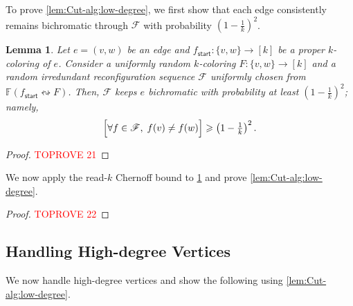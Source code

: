 \documentclass[11pt,fleqn]{article}
\renewcommand{\geq}{\geqslant}
\newcommand{\reco}{\leftrightsquigarrow}
\newcommand{\sss}{\mathsf{start}}
\newcommand{\f}{f}
\newcommand{\frnd}{F}
\newcommand{\sqcol}{\scrF}
\newcommand{\stsqcol}{\bbF}
\newcommand{\bbF}{\mathbb{F}}
\newcommand{\scrF}{\mathscr{F}}
\let\Pr\relax\DeclareMathOperator*{\Pr}{\mathbb{P}}
\newtheorem{lemma}[theorem]{Lemma}
\theoremstyle{definition}
\numberwithin{equation}{section}
\begin{document}
To prove \cref{lem:Cut-alg:low-degree},
we first show that 
each edge consistently remains bichromatic through $\sqcol$
with probability $\left(1-\frac{1}{k}\right)^2$.


\begin{lemma}
\label{lem:Cut-alg:outward}
Let $e = (v,w)$ be an edge and
$\f_\sss \colon \{v,w\} \to [k]$ be a proper $k$-coloring of $e$.
Consider a uniformly random $k$-coloring $\frnd \colon \{v,w\} \to [k]$ and
a random irredundant reconfiguration sequence $\sqcol$
uniformly chosen from $\stsqcol(\f_\sss \reco \frnd)$.
Then, $\sqcol$ keeps $e$ bichromatic with probability at least
$\left(1-\frac{1}{k}\right)^2$\textup{;}
namely,
\begin{align}
    \Pr\Bigl[
        \forall \f \in \sqcol, \;
        \f(v) \neq \f(w)
    \Bigr]
    \geq \left(1-\tfrac{1}{k}\right)^2.
\end{align}
\end{lemma}
\begin{proof}\textcolor{red}{TOPROVE 21}\end{proof}


We now apply the read-$k$ Chernoff bound to \cref{lem:Cut-alg:outward}
and prove \cref{lem:Cut-alg:low-degree}.


\begin{proof}\textcolor{red}{TOPROVE 22}\end{proof}










\subsection{Handling High-degree Vertices}
\label{subsec:Cut-alg:high-degree}

We now handle high-degree vertices and show the following using \cref{lem:Cut-alg:low-degree}.
\end{document}
